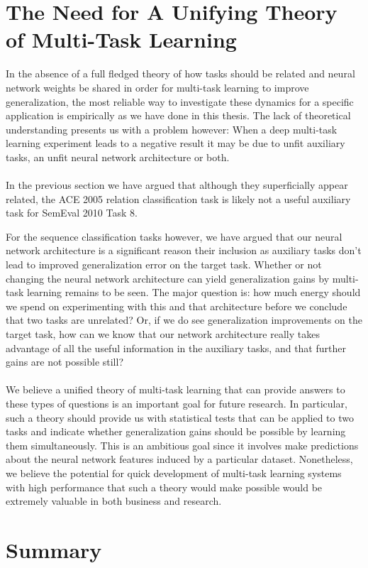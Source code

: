 \section{The Need for A Unifying Theory of Multi-Task Learning}
In the absence of a full fledged theory of how tasks should be related and neural network weights be shared in order for multi-task learning to improve generalization, the most reliable way to investigate these dynamics for a specific application is empirically as we have done in this thesis. The lack of theoretical understanding presents us with a problem however: When a deep multi-task learning experiment leads to a negative result it may be due to unfit auxiliary tasks, an unfit neural network architecture or both.
\\\\
In the previous section we have argued that although they superficially appear related, the ACE 2005 relation classification task is likely not a useful auxiliary task for SemEval 2010 Task 8.

For the sequence classification tasks however, we have argued that our neural network architecture is a significant reason their inclusion as auxiliary tasks don't lead to improved generalization error on the target task. Whether or not changing the neural network architecture can yield generalization gains by multi-task learning remains to be seen. The major question is: how much energy should we spend on experimenting with this and that architecture before we conclude that two tasks are unrelated? Or, if we do see generalization improvements on the target task, how can we know that our network architecture really takes advantage of all the useful information in the auxiliary tasks, and that further gains are not possible still?
\\\\
We believe a unified theory of multi-task learning that can provide answers to these types of questions is an important goal for future research. In particular, such a theory should provide us with statistical tests that can be applied to two tasks and indicate whether generalization gains should be possible by learning them simultaneously. This is an ambitious goal since it involves make predictions about the neural network features induced by a particular dataset. Nonetheless, we believe the potential for quick development of multi-task learning systems with high performance that such a theory would make possible would be extremely valuable in both business and research.

\section{Summary}

